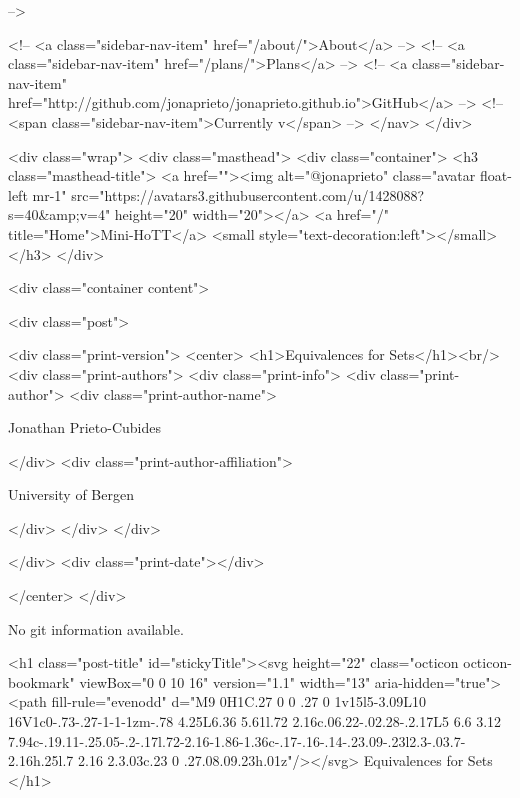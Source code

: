       
     -->

    <!-- <a class="sidebar-nav-item" href="/about/">About</a> -->
    <!-- <a class="sidebar-nav-item" href="/plans/">Plans</a> -->
    <!-- <a class="sidebar-nav-item" href="http://github.com/jonaprieto/jonaprieto.github.io">GitHub</a> -->
    <!-- <span class="sidebar-nav-item">Currently v</span> -->
  </nav>
</div>

    <div class="wrap">
      <div class="masthead">
        <div class="container">
          <h3 class="masthead-title">
            <a href=""><img alt="@jonaprieto" class="avatar float-left mr-1" src="https://avatars3.githubusercontent.com/u/1428088?s=40&amp;v=4" height="20" width="20"></a>
            <a href="/" title="Home">Mini-HoTT</a>
            <small style="text-decoration:left"></small>
          </h3>
        </div>
      
      <div class="container content">
        







<div class="post">

  <div class="print-version">
    <center>
      <h1>Equivalences for Sets</h1><br/>
        <div class="print-authors">
          <div class="print-info">
            <div class="print-author">
              <div class="print-author-name">
                
                  Jonathan Prieto-Cubides
                
              </div>
              <div class="print-author-affiliation">
                
                  University of Bergen
                
                </div>
            </div>
          </div>
          
          
        </div>
        <div class="print-date"></div>
        
        
    </center>
  </div>

  
  No git information available.
  
  <h1 class="post-title" id="stickyTitle"><svg height="22" class="octicon octicon-bookmark" viewBox="0 0 10 16" version="1.1" width="13" aria-hidden="true"><path fill-rule="evenodd" d="M9 0H1C.27 0 0 .27 0 1v15l5-3.09L10 16V1c0-.73-.27-1-1-1zm-.78 4.25L6.36 5.61l.72 2.16c.06.22-.02.28-.2.17L5 6.6 3.12 7.94c-.19.11-.25.05-.2-.17l.72-2.16-1.86-1.36c-.17-.16-.14-.23.09-.23l2.3-.03.7-2.16h.25l.7 2.16 2.3.03c.23 0 .27.08.09.23h.01z"/></svg> Equivalences for Sets
  </h1>

